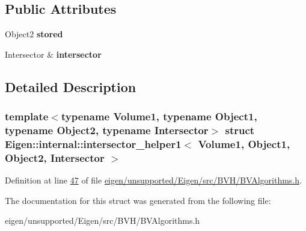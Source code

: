 \subsection*{Public Attributes}
\begin{DoxyCompactItemize}
\item 
\mbox{\label{struct_eigen_1_1internal_1_1intersector__helper1_a805d67217465863ac9039f1b03b3878d}} 
Object2 {\bfseries stored}
\item 
\mbox{\label{struct_eigen_1_1internal_1_1intersector__helper1_a40feb80b43643efe46123768b8fe9ab6}} 
Intersector \& {\bfseries intersector}
\end{DoxyCompactItemize}


\subsection{Detailed Description}
\subsubsection*{template$<$typename Volume1, typename Object1, typename Object2, typename Intersector$>$\newline
struct Eigen\+::internal\+::intersector\+\_\+helper1$<$ Volume1, Object1, Object2, Intersector $>$}



Definition at line \hyperlink{eigen_2unsupported_2_eigen_2src_2_b_v_h_2_b_v_algorithms_8h_source_l00047}{47} of file \hyperlink{eigen_2unsupported_2_eigen_2src_2_b_v_h_2_b_v_algorithms_8h_source}{eigen/unsupported/\+Eigen/src/\+B\+V\+H/\+B\+V\+Algorithms.\+h}.



The documentation for this struct was generated from the following file\+:\begin{DoxyCompactItemize}
\item 
eigen/unsupported/\+Eigen/src/\+B\+V\+H/\+B\+V\+Algorithms.\+h\end{DoxyCompactItemize}

